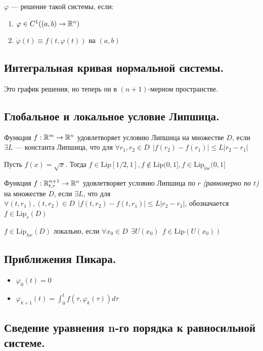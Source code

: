\(\varphi\) --- решение такой системы, если:
\begin{enumerate}
    \item \(\varphi \in C^1((a, b) \to \mathbb{R}^n)\)
    \item \(\dot \varphi(t) \equiv f(t, \varphi(t))\) на \((a, b)\)
\end{enumerate}

\subsection*{Интегральная кривая нормальной системы.}

Это график решения, но теперь он в \((n + 1)\)-мерном пространстве.

\subsection*{Глобальное и локальное условие Липшица.}

Функция \(f : \mathbb{R}^m \to \mathbb{R}^n\) удовлетворяет условию Липшица на множестве \(D\), если \(\exists L\) --- константа Липшица, что для \(\forall r_1, r_2\in D \ \ |f(r_2) - f(r_1)| \leq L|r_2 - r_1|\)

\begin{example}
    Пусть \(f(x) = \sqrt{x}\). Тогда \(f\in \text{Lip}[1 / 2, 1], f\notin \text{Lip}(0, 1], f\in \text{Lip}_{loc}(0, 1]\)
\end{example}

Функция \(f : \mathbb{R}^{n + 1}_{t, r} \to \mathbb{R}^n\) удовлетворяет условию Липшица по \(r\) \textit{(равномерно по \(t\))} на множестве \(D\), если \(\exists L\), что для \(\forall (t, r_1), (t, r_2)\in D \ \ |f(t, r_2) - f(t, r_1)| \leq L|r_2 - r_1|\), обозначается \(f\in \text{Lip}_r(D)\)

\(f \in \text{Lip}_{loc}(D)\) локально, если \(\forall x_0\in D \ \ \exists U(x_0) \ \ f\in \text{Lip}(U(x_0))\)

\subsection*{Приближения Пикара.}

\begin{itemize}
    \item \(\varphi_0(t) = 0\)
    \item \(\varphi_{k + 1}(t) = \int_0^t f(\tau, \varphi_k(\tau))d\tau\)
\end{itemize}

\subsection*{Сведение уравнения n-го порядка к равносильной системе.}

